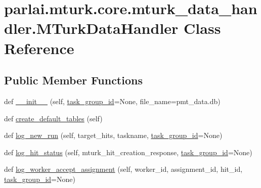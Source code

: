 \hypertarget{classparlai_1_1mturk_1_1core_1_1mturk__data__handler_1_1MTurkDataHandler}{}\section{parlai.\+mturk.\+core.\+mturk\+\_\+data\+\_\+handler.\+M\+Turk\+Data\+Handler Class Reference}
\label{classparlai_1_1mturk_1_1core_1_1mturk__data__handler_1_1MTurkDataHandler}
\subsection*{Public Member Functions}
\begin{DoxyCompactItemize}
\item 
def \hyperlink{classparlai_1_1mturk_1_1core_1_1mturk__data__handler_1_1MTurkDataHandler_a7edbb0b1f770656a6ed49990cd3933c1}{\+\_\+\+\_\+init\+\_\+\+\_\+} (self, \hyperlink{classparlai_1_1mturk_1_1core_1_1mturk__data__handler_1_1MTurkDataHandler_abef46871b0b4686b67f0b4dcea99e81c}{task\+\_\+group\+\_\+id}=None, file\+\_\+name=\textquotesingle{}pmt\+\_\+data.\+db\textquotesingle{})
\item 
def \hyperlink{classparlai_1_1mturk_1_1core_1_1mturk__data__handler_1_1MTurkDataHandler_a8427973bbee0e94309a60848f155206f}{create\+\_\+default\+\_\+tables} (self)
\item 
def \hyperlink{classparlai_1_1mturk_1_1core_1_1mturk__data__handler_1_1MTurkDataHandler_a33facd12d38fa532a28a113b909073a6}{log\+\_\+new\+\_\+run} (self, target\+\_\+hits, taskname, \hyperlink{classparlai_1_1mturk_1_1core_1_1mturk__data__handler_1_1MTurkDataHandler_abef46871b0b4686b67f0b4dcea99e81c}{task\+\_\+group\+\_\+id}=None)
\item 
def \hyperlink{classparlai_1_1mturk_1_1core_1_1mturk__data__handler_1_1MTurkDataHandler_acfa910fb6805c19a8693b7688f1fb133}{log\+\_\+hit\+\_\+status} (self, mturk\+\_\+hit\+\_\+creation\+\_\+response, \hyperlink{classparlai_1_1mturk_1_1core_1_1mturk__data__handler_1_1MTurkDataHandler_abef46871b0b4686b67f0b4dcea99e81c}{task\+\_\+group\+\_\+id}=None)
\item 
def \hyperlink{classparlai_1_1mturk_1_1core_1_1mturk__data__handler_1_1MTurkDataHandler_a080c2ffbf861cfe6175491a7a0bdd0ce}{log\+\_\+worker\+\_\+accept\+\_\+assignment} (self, worker\+\_\+id, assignment\+\_\+id, hit\+\_\+id, \hyperlink{classparlai_1_1mturk_1_1core_1_1mturk__data__handler_1_1MTurkDataHandler_abef46871b0b4686b67f0b4dcea99e81c}{task\+\_\+group\+\_\+id}=None)

\end{DoxyCompactItemize}
